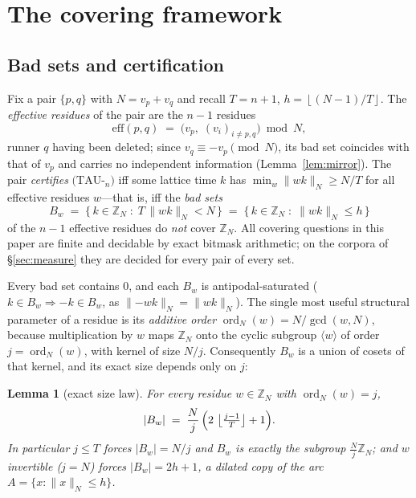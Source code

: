\documentclass[11pt,a4paper]{article}
\numberwithin{equation}{section}
\theoremstyle{plain}
\newtheorem{lemma}[theorem]{Lemma}
\theoremstyle{definition}
\theoremstyle{remark}
\newcommand{\Z}{\mathbb{Z}}
\newcommand{\floor}[1]{\left\lfloor #1 \right\rfloor}
\newcommand{\wn}[1]{\lVert #1 \rVert_{N}}
\DeclareMathOperator{\ord}{ord}
\begin{document}

\section{The covering framework}\label{sec:covering}

\subsection{Bad sets and certification}

Fix a pair $\{p,q\}$ with $N=v_p+v_q$ and recall
$T=n+1$, $h=\floor{(N-1)/T}$. The \emph{effective residues} of the pair are
the $n-1$ residues
\[
\mathrm{eff}(p,q)\;=\;\bigl(v_p,\; (v_i)_{i\ne p,q}\bigr)\bmod N ,
\]
runner $q$ having been deleted; since $v_q\equiv -v_p\pmod N$, its bad set
coincides with that of $v_p$ and carries no independent information
(Lemma~\ref{lem:mirror}). The pair \emph{certifies} $(\mathrm{TAU}$-$_n)$
iff some lattice time $k$ has
$\min_w \wn{wk}\ge N/T$ for all effective residues $w$---that is, iff the
\emph{bad sets}
\[
B_w\;=\;\{\,k\in\Z_N \;:\; T\,\wn{wk}<N\,\}
     \;=\;\{\,k\in\Z_N \;:\; \wn{wk}\le h\,\}
\]
of the $n-1$ effective residues do \emph{not} cover $\Z_N$. All covering
questions in this paper are finite and decidable by exact bitmask
arithmetic; on the corpora of \S\ref{sec:measure} they are decided for
every pair of every set.

Every bad set contains $0$, and each $B_w$ is antipodal-saturated
($k\in B_w\Rightarrow -k\in B_w$, as $\wn{-wk}=\wn{wk}$). The single most
useful structural parameter of a residue is its \emph{additive order}
$\ord_N(w)=N/\gcd(w,N)$, because multiplication by $w$ maps $\Z_N$ onto
the cyclic subgroup $\langle w\rangle$ of order $j=\ord_N(w)$, with kernel
of size $N/j$. Consequently $B_w$ is a union of cosets of that kernel, and
its exact size depends only on $j$:

\begin{lemma}[exact size law]\label{lem:size}
For every residue $w\in\Z_N$ with $\ord_N(w)=j$,
\[
|B_w|\;=\;\frac{N}{j}\,\Bigl(2\,\floor{\tfrac{j-1}{T}}+1\Bigr).
\]
In particular $j\le T$ forces $|B_w|=N/j$ and $B_w$ is \emph{exactly} the
subgroup $\tfrac{N}{j}\Z_N$; and $w$ invertible ($j=N$) forces
$|B_w|=2h+1$, a dilated copy of the arc $A=\{x:\wn{x}\le h\}$.
\end{lemma}
\end{document}
